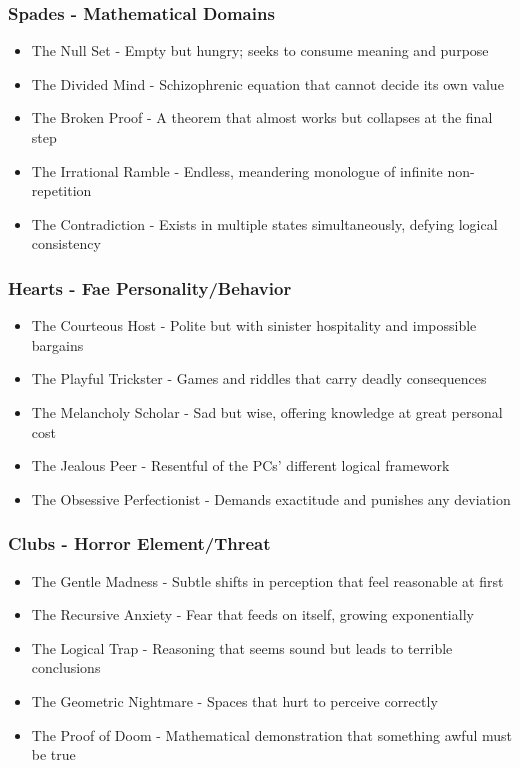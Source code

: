 \documentclass[11pt]{article}
\begin{document}
\subsubsection{Spades - Mathematical Domains}

\begin{itemize}
\item The Null Set - Empty but hungry; seeks to consume meaning and purpose
\item The Divided Mind - Schizophrenic equation that cannot decide its own value
\item The Broken Proof - A theorem that almost works but collapses at the final step
\item The Irrational Ramble - Endless, meandering monologue of infinite non-repetition
\item The Contradiction - Exists in multiple states simultaneously, defying logical consistency
\end{itemize}

\subsubsection{Hearts - Fae Personality/Behavior}

\begin{itemize}
\item The Courteous Host - Polite but with sinister hospitality and impossible bargains
\item The Playful Trickster - Games and riddles that carry deadly consequences
\item The Melancholy Scholar - Sad but wise, offering knowledge at great personal cost
\item The Jealous Peer - Resentful of the PCs' different logical framework
\item The Obsessive Perfectionist - Demands exactitude and punishes any deviation
\end{itemize}

\subsubsection{Clubs - Horror Element/Threat}

\begin{itemize}
\item The Gentle Madness - Subtle shifts in perception that feel reasonable at first
\item The Recursive Anxiety - Fear that feeds on itself, growing exponentially
\item The Logical Trap - Reasoning that seems sound but leads to terrible conclusions
\item The Geometric Nightmare - Spaces that hurt to perceive correctly
\item The Proof of Doom - Mathematical demonstration that something awful must be true
\end{itemize}
\end{document}

